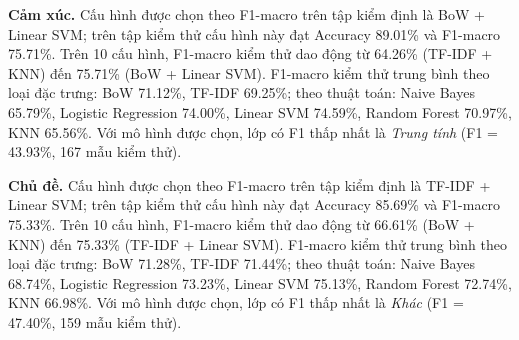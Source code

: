\textbf{Cảm xúc.} Cấu hình được chọn theo F1-macro trên tập kiểm định là BoW + Linear SVM; trên tập kiểm thử cấu hình này đạt Accuracy 89.01\% và F1-macro 75.71\%. Trên 10 cấu hình, F1-macro kiểm thử dao động từ 64.26\% (TF-IDF + KNN) đến 75.71\% (BoW + Linear SVM). F1-macro kiểm thử trung bình theo loại đặc trưng: BoW 71.12\%, TF-IDF 69.25\%; theo thuật toán: Naive Bayes 65.79\%, Logistic Regression 74.00\%, Linear SVM 74.59\%, Random Forest 70.97\%, KNN 65.56\%. Với mô hình được chọn, lớp có F1 thấp nhất là \textit{Trung tính} (F1 = 43.93\%, 167 mẫu kiểm thử).

\textbf{Chủ đề.} Cấu hình được chọn theo F1-macro trên tập kiểm định là TF-IDF + Linear SVM; trên tập kiểm thử cấu hình này đạt Accuracy 85.69\% và F1-macro 75.33\%. Trên 10 cấu hình, F1-macro kiểm thử dao động từ 66.61\% (BoW + KNN) đến 75.33\% (TF-IDF + Linear SVM). F1-macro kiểm thử trung bình theo loại đặc trưng: BoW 71.28\%, TF-IDF 71.44\%; theo thuật toán: Naive Bayes 68.74\%, Logistic Regression 73.23\%, Linear SVM 75.13\%, Random Forest 72.74\%, KNN 66.98\%. Với mô hình được chọn, lớp có F1 thấp nhất là \textit{Khác} (F1 = 47.40\%, 159 mẫu kiểm thử).
